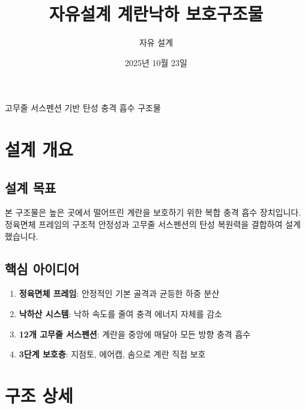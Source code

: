 \documentclass[a4paper,12pt]{article}
\title{\Large\textbf{자유설계 계란낙하 보호구조물}}
\author{자유 설계}
\date{2025년 10월 23일}
\begin{document}
\begin{CJK}{UTF8}{mj}

\maketitle

\begin{center}
\large
고무줄 서스펜션 기반 탄성 충격 흡수 구조물
\end{center}

\vspace{1cm}

\tableofcontents
\newpage

\section{설계 개요}

\subsection{설계 목표}

본 구조물은 높은 곳에서 떨어뜨린 계란을 보호하기 위한 복합 충격 흡수 장치입니다. 
정육면체 프레임의 구조적 안정성과 고무줄 서스펜션의 탄성 복원력을 결합하여 설계했습니다.

\subsection{핵심 아이디어}

\begin{enumerate}[leftmargin=*]
    \item \textbf{정육면체 프레임}: 안정적인 기본 골격과 균등한 하중 분산
    \item \textbf{낙하산 시스템}: 낙하 속도를 줄여 충격 에너지 자체를 감소
    \item \textbf{12개 고무줄 서스펜션}: 계란을 중앙에 매달아 모든 방향 충격 흡수
    \item \textbf{3단계 보호층}: 지점토, 에어캡, 솜으로 계란 직접 보호
\end{enumerate}

\section{구조 상세}


\end{CJK}
\end{document}
